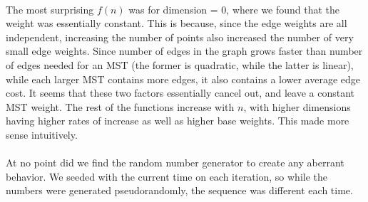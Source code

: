 \documentclass[11pt]{article}
\begin{document}
\\
The most surprising $f(n)$ was for dimension = 0, where we found that the weight was essentially constant. This is because, since the edge weights are all independent, increasing the number of points also increased the number of very small edge weights. Since number of edges in the graph grows faster than number of edges needed for an MST (the former is quadratic, while the latter is linear), while each larger MST contains more edges, it also contains a lower average edge cost. It seems that these two factors essentially cancel out, and leave a constant MST weight. The rest of the functions increase with $n$, with higher dimensions having higher rates of increase as well as higher base weights. This made more sense intuitively.
\\
\\
At no point did we find the random number generator to create any aberrant behavior. We seeded with the current time on each iteration, so while the numbers were generated pseudorandomly, the sequence was different each time.
\end{document}
